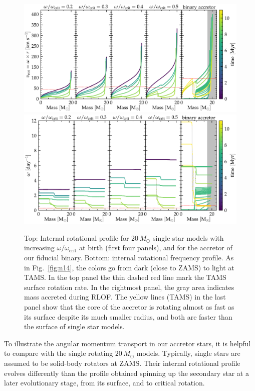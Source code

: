 \documentclass[twocolumn,twocolappendix,trackchanges]{aastex63}
\DeclareRobustCommand{\Figref}[1]{Fig.~\ref{#1}}
\begin{document}
\begin{figure}[tbp]
  \centering
  \includegraphics[width=\textwidth]{zeta_Rotational_struct}
  \includegraphics[width=\textwidth]{omega_struct}
  \caption{Top: Internal rotational profile for $20\,M_\odot$ single
    star models with increasing $\omega/\omega_\mathrm{crit}$ at birth
    (first four panels), and for the accretor of our fiducial
    binary. Bottom: internal rotational frequency profile. As in
    \Figref{fig:n14}, the colors go from dark (close to ZAMS) to light
    at TAMS. In the top panel the thin dashed red line mark the TAMS
    surface rotation rate. In the rightmost panel, the gray area
    indicates mass accreted during RLOF. The yellow lines (TAMS) in
    the last panel show that the core of the accretor is rotating
    almost as fast as its surface despite its much smaller radius, and
    both are faster than the surface of single star models.}
  \label{fig:struct_rot}
\end{figure}

To illustrate the angular momentum transport in our accretor stars, it
is helpful to compare with the single rotating $20\,M_\odot$
models. Typically, single stars are assumed to be solid-body rotators at
ZAMS. Their internal rotational profile evolves differently than the profile
obtained spinning up the secondary star at a later evolutionary stage,
from its surface, and to critical rotation.
\end{document}
